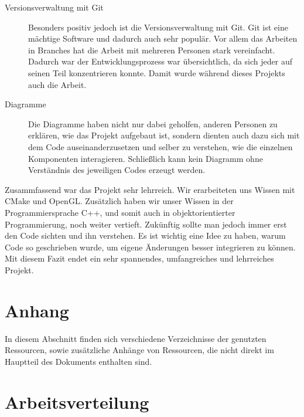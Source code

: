 \documentclass{article}
\newcommand{\listofcode}{
  \doublespacing
  \listof{Code}{Quelltextverzeichnis}
}
\begin{document}
\begin{description}
  \item[Versionsverwaltung mit Git] Besonders positiv jedoch ist die Versionsverwaltung mit Git. Git ist eine mächtige Software und dadurch auch sehr populär. Vor allem das Arbeiten in Branches hat die Arbeit mit mehreren Personen stark vereinfacht. Dadurch war der Entwicklungsprozess war  übersichtlich, da sich jeder auf seinen Teil konzentrieren konnte. Damit wurde während dieses Projekts auch die Arbeit.
  \item[Diagramme] Die Diagramme haben nicht nur dabei geholfen, anderen Personen zu erklären, wie das Projekt aufgebaut ist, sondern dienten auch dazu sich mit dem Code auseinanderzusetzen und selber zu verstehen, wie die einzelnen Komponenten interagieren. Schließlich kann kein Diagramm ohne Verständnis des jeweiligen Codes erzeugt werden.
\end{description}

Zusammfassend war das Projekt sehr lehrreich. Wir erarbeiteten uns Wissen mit CMake und OpenGL. Zusätzlich haben wir unser Wissen in der Programmiersprache C++, und somit auch in objektorientierter Programmierung, noch weiter vertieft. Zukünftig sollte man jedoch immer erst den Code sichten und ihn verstehen. Es ist wichtig eine Idee zu haben, warum Code so geschrieben wurde, um eigene Änderungen besser integrieren zu können. Mit diesem Fazit endet ein sehr spannendes, umfangreiches und lehrreiches Projekt.


\newpage

\section{Anhang}

In diesem Abschnitt finden sich verschiedene Verzeichnisse der genutzten 
Ressourcen, sowie zusätzliche Anhänge von Ressourcen, die nicht direkt im 
Hauptteil des Dokuments enthalten sind.

\listoffigures

\iffalse
\section*{Arbeitsverteilung}
\end{document}
